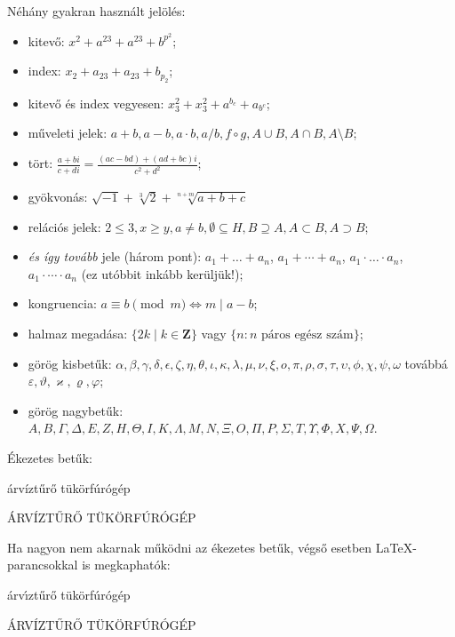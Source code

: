 \documentclass[a4paper]{article}
\begin{document}
Néhány gyakran használt jelölés:
\begin{itemize} %

\item kitevő: %
$x^2+a^23+a^{23}+b^{p^2}$;

\item index: 
$x_2+a_23+a_{23}+b_{p_2}$;

\item kitevő és index vegyesen: 
$x_3^2+x^2_3+a^{b_c}+a_{b^c}$;

\item műveleti jelek: 
$a+b, a-b, a \cdot b, a/b, f \circ g, A \cup B, A \cap B, A \setminus B$;

\item tört: 
$\frac{a+bi}{c+di}=\frac{(ac-bd)+(ad+bc)i}{c^2+d^2}$;

\item gyökvonás:
$\sqrt{-1}+\sqrt[3]{2}+\sqrt[n+m]{a+b+c}$

\item relációs jelek: 
$2 \leq 3, x \geq y, a \neq b, \emptyset \subseteq H, B \supseteq A, A \subset B, A \supset B$;
\item \emph{és így tovább} jele (három pont): 
$a_1+ \ldots +a_n$,
$a_1+ \cdots +a_n$,
$a_1 \cdot\ldots\cdot a_n$,
$a_1 \cdot\cdots\cdot a_n$ (ez utóbbit inkább kerüljük!);

\item kongruencia: 
$a \equiv b \pmod m \iff m \mid a-b$;

\item halmaz megadása: $\{ 2k \mid k \in \mathbf{Z} \}$ vagy $\{ n : n \text{ páros egész szám} \}$;

\item görög kisbetűk:
$\alpha,\beta,\gamma,\delta,\epsilon,\zeta,\eta,\theta,\iota,\kappa,\lambda,\mu,\nu,\xi,o,\pi,\rho,\sigma,\tau,\upsilon,\phi,\chi,\psi,\omega$ 
továbbá $\varepsilon,\vartheta,\varkappa,\varrho,\varphi$;

\item görög nagybetűk:
$A,B,\Gamma,\Delta,E,Z,H,\Theta,I,K,\Lambda,M,N,\Xi,O,\Pi,P,\Sigma,T,\Upsilon,\Phi,X,\Psi,\Omega$.

\end{itemize} %

\bigskip

Ékezetes betűk:

árvíztűrő tükörfúrógép

ÁRVÍZTŰRŐ TÜKÖRFÚRÓGÉP

Ha nagyon nem akarnak működni az ékezetes betűk, végső esetben LaTeX-parancsokkal is megkaphatók:

\'{a}rv\'{\i}zt\H{u}r\H{o} t\"{u}k\"{o}rf\'{u}r\'{o}g\'{e}p

\'{A}RV\'{I}ZT\H{U}R\H{O} T\"{U}K\"{O}RF\'{U}R\'{O}G\'{E}P
\end{document}
